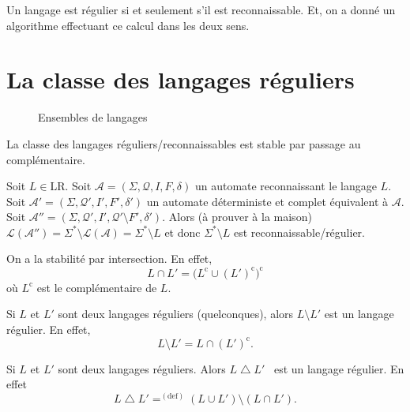 \begin{thm}
	Un langage est régulier si et seulement s'il est reconnaissable. Et, on a donné un algorithme effectuant ce calcul dans les deux sens.
\end{thm}

\section{La classe des langages réguliers}

\begin{figure}[H]
	\centering
	\caption{Ensembles de langages}
\end{figure}

\begin{prop}
	La classe des langages réguliers/reconnaissables est stable par passage au complémentaire.
\end{prop}

\begin{prv}
	Soit $L \in \mathrm{LR}$. Soit $\mathcal{A} = (\Sigma, \mathcal{Q}, I, F, \delta)$\/ un automate reconnaissant le langage $L$. Soit $\mathcal{A}'= (\Sigma, \mathcal{Q}', I', F', \delta')$\/ un automate déterministe et complet équivalent à $\mathcal{A}$. Soit $\mathcal{A}'' = (\Sigma, \mathcal{Q}', I', \mathcal{Q}'\setminus F', \delta')$.
	Alors (à prouver à la maison) $\mathcal{L}(\mathcal{A}'') = \Sigma^* \setminus \mathcal{L}(\mathcal{A}) = \Sigma^* \setminus L$\/ et donc $\Sigma^* \setminus L$\/ est reconnaissable/régulier.
\end{prv}

\begin{crlr}
	On a la stabilité par intersection. En effet, \[
		L \cap L' = \Big(L^{\mathrm{c}} \cup (L')^{\mathrm{c}}\Big)^{\mathrm{c}}
	\] où $L^{\mathrm{c}}$\/ est le complémentaire de $L$.
\end{crlr}

\begin{crlr}
	Si $L$\/ et $L'$\/ sont deux langages réguliers (quelconques), alors $L \setminus L'$\/ est un langage régulier. En effet, \[
		L \setminus L' = L \cap (L')^\mathrm{c}
	.\]
\end{crlr}

\begin{crlr}
	Si $L$\/ et $L'$\/ sont deux langages réguliers. Alors $L \mathbin\triangle L'$\/ \footnotemark\ est un langage régulier. En effet \[
		L \mathbin\triangle L' \mathrel{\mathop=^{\mathrm{(def)}}} (L \cup L') \setminus (L \cap L')
	.\]
\end{crlr}

